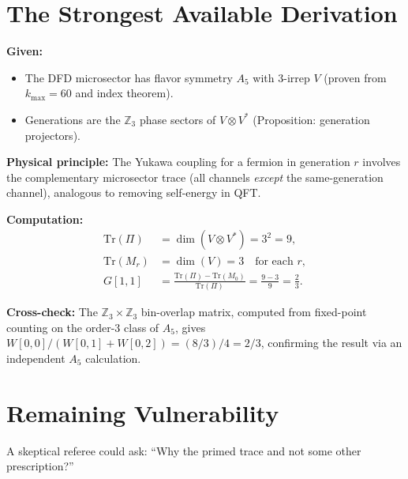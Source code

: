 \documentclass[11pt]{article}
\theoremstyle{definition}
\begin{document}
\section{The Strongest Available Derivation}

\begin{tcolorbox}[colback=blue!5!white, colframe=blue!60!black, title={Recommended Derivation Narrative}]
\textbf{Given:}
\begin{itemize}
\item The DFD microsector has flavor symmetry $A_5$ with 3-irrep $V$ (proven from $k_{\max} = 60$ and index theorem).
\item Generations are the $\mathbb{Z}_3$ phase sectors of $V \otimes V^*$ (Proposition: generation projectors).
\end{itemize}

\textbf{Physical principle:}
The Yukawa coupling for a fermion in generation $r$ involves the complementary microsector trace
(all channels \emph{except} the same-generation channel), analogous to removing self-energy in QFT.

\textbf{Computation:}
\begin{align}
\mathrm{Tr}(\Pi) &= \dim(V \otimes V^*) = 3^2 = 9, \\
\mathrm{Tr}(M_r) &= \dim(V) = 3 \quad \text{for each } r, \\
G[1,1] &= \frac{\mathrm{Tr}(\Pi) - \mathrm{Tr}(M_0)}{\mathrm{Tr}(\Pi)} = \frac{9 - 3}{9} = \frac{2}{3}.
\end{align}

\textbf{Cross-check:}
The $\mathbb{Z}_3 \times \mathbb{Z}_3$ bin-overlap matrix, computed from fixed-point counting on the
order-3 class of $A_5$, gives $W[0,0]/(W[0,1]+W[0,2]) = (8/3)/4 = 2/3$, confirming the result
via an independent $A_5$ calculation.
\end{tcolorbox}

\section{Remaining Vulnerability}

A skeptical referee could ask: ``Why the primed trace and not some other prescription?''
\end{document}
